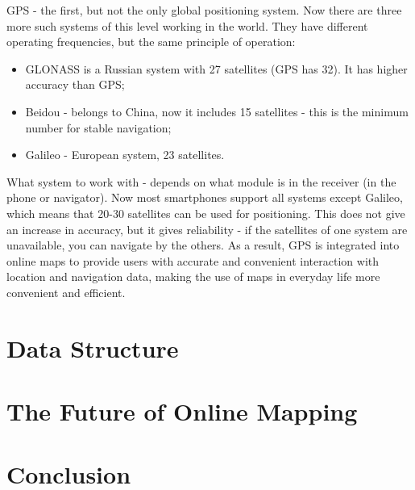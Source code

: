 \documentclass[10pt,oneside,english,a4paper]{article}
\begin{document}
GPS - the first, but not the only global positioning system. Now there are three more such systems of this level working in the world. They have different operating frequencies, but the same principle of operation:

\begin{itemize}
\item GLONASS is a Russian system with 27 satellites (GPS has 32). It has higher accuracy than GPS;
\item Beidou - belongs to China, now it includes 15 satellites - this is the minimum number for stable navigation;
\item Galileo - European system, 23 satellites.
\end{itemize}

What system to work with - depends on what module is in the receiver (in the phone or navigator). Now most smartphones support all systems except Galileo, which means that 20-30 satellites can be used for positioning. This does not give an increase in accuracy, but it gives reliability - if the satellites of one system are unavailable, you can navigate by the others. As a result, GPS is integrated into online maps to provide users with accurate and convenient interaction with location and navigation data, making the use of maps in everyday life more convenient and efficient.
{\tiny }
\section{Data Structure} \label{data}

\section{The Future of Online Mapping} \label{future}

\section{Conclusion} \label{conclusion}




\end{document}
